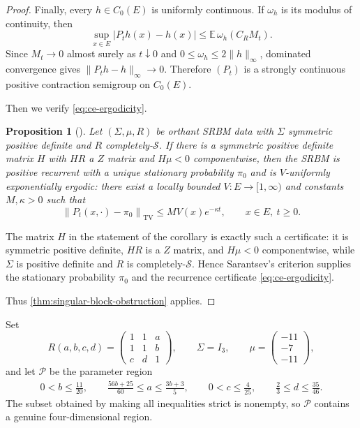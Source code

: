 \documentclass[aihp]{imsart}
\numberwithin{equation}{section}
\theoremstyle{plain}
\newtheorem{proposition}[proposition]{Proposition}
\theoremstyle{definition}
\newcommand{\TV}{\mathrm{TV}}
\newcommand{\1}{\mathbf 1}
\newcommand{\norm}[1]{\left\lVert #1\right\rVert}
\begin{document}
\begin{proof}
Finally, every $h\in C_0(E)$ is uniformly continuous. If $\omega_h$ is its modulus
of continuity, then
\[
        \sup_{x\in E}|P_t h(x)-h(x)|
        \le
        \mathbb E\,\omega_h(C_RM_t).
\]
Since $M_t\to0$ almost surely as $t\downarrow0$ and
$0\le \omega_h\le 2\|h\|_\infty$, dominated convergence gives $\|P_t h-h\|_\infty\to0 .$ Therefore $(P_t)$ is a strongly continuous positive contraction semigroup on
$C_0(E)$.

Then we verify \eqref{eq:ce-ergodicity}.

\begin{proposition}[{\normalfont\cite[Corollary~3.2]{Sarantsev2017}}]Let $(\Sigma,\mu,R)$ be orthant SRBM data with $\Sigma$ symmetric positive definite and $R$ completely-$\mathcal S$. If there is a symmetric positive definite matrix $H$ with $HR$ a $Z$ matrix and $H\mu<0$ componentwise, then the SRBM is positive recurrent with a unique stationary probability $\pi_0$ and is $V$-uniformly exponentially ergodic: there exist a locally bounded $V\colon E\to[1,\infty)$ and constants $M,\kappa>0$ such that
\[
 \norm{P_t(x,\cdot)-\pi_0}_{\TV}\le M V(x)e^{-\kappa t},
 \qquad x\in E,\ t\ge0.
\]
\end{proposition} 

The matrix $H$ in the statement of the corollary is exactly such a certificate: it is symmetric positive definite, $HR$ is a $Z$ matrix, and $H\mu<0$ componentwise, while $\Sigma$ is positive definite and $R$ is completely-$\mathcal S$. Hence Sarantsev's criterion supplies the stationary probability $\pi_0$ and the recurrence certificate \eqref{eq:ce-ergodicity}.

Thus \cref{thm:singular-block-obstruction} applies.
\end{proof}

Set
\begin{equation}\label{eq:ce-R-family}
R(a,b,c,d)=
\begin{pmatrix}
1&1&a\\
1&1&b\\
c&d&1
\end{pmatrix},
\qquad
\Sigma=I_3,
\qquad
\mu=\begin{pmatrix}-11\\-7\\-11\end{pmatrix},
\end{equation}
and let $\mathcal P$ be the parameter region
\begin{equation}\label{eq:ce-parameter-region}
\begin{gathered}
0<b\le\frac{11}{20},
\qquad
\frac{56b+25}{60}\le a\le\frac{3b+3}{5},\qquad
0<c\le\frac4{25},
\qquad
\frac23\le d\le\frac{35}{46}.
\end{gathered}
\end{equation}
The subset obtained by making all inequalities strict is nonempty, so $\mathcal P$ contains a genuine four-dimensional region.
\end{document}
